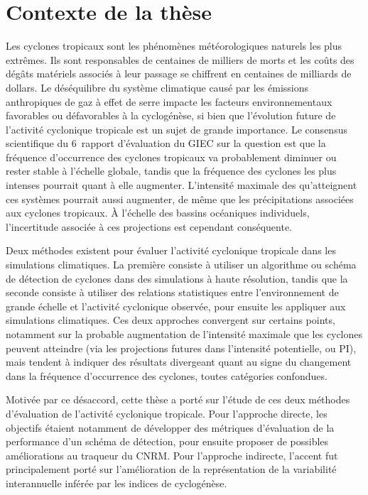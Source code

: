 \documentclass[../main.tex]{subfiles}
\begin{document}
\section*{Contexte de la thèse}

Les cyclones tropicaux sont les phénomènes météorologiques naturels les plus extrêmes. Ils sont responsables de centaines de milliers de morts et les coûts des
dégâts matériels associés à leur passage se chiffrent en centaines de milliards de dollars. Le déséquilibre du système climatique causé par les émissions
anthropiques de gaz à effet de serre impacte les facteurs environnementaux favorables ou défavorables à la cyclogénèse, si bien que l'évolution future de
l'activité cyclonique tropicale est un sujet de grande importance. Le consensus scientifique du 6\ieme\ rapport d'évaluation du GIEC sur la question est que la
fréquence d'occurrence des cyclones tropicaux va probablement diminuer ou rester stable à l'échelle globale, tandis que la fréquence des cyclones les plus
intenses pourrait quant à elle augmenter. L'intensité maximale des qu'atteignent ces systèmes pourrait aussi augmenter, de même que les précipitations associées
aux cyclones tropicaux. À l'échelle des bassins océaniques individuels, l'incertitude associée à ces projections est cependant conséquente.

Deux méthodes existent pour évaluer l'activité cyclonique tropicale dans les simulations climatiques. La première consiste à utiliser un algorithme ou schéma de
détection de cyclones dans des simulations à haute résolution, tandis que la seconde consiste à utiliser des relations statistiques entre l'environnement de
grande échelle et l'activité cyclonique observée, pour ensuite les appliquer aux simulations climatiques. Ces deux approches convergent sur certains points,
notamment sur la probable augmentation de l'intensité maximale que les cyclones peuvent atteindre (via les projections futures dans l'intensité potentielle, ou
PI), mais tendent à indiquer des résultats divergeant quant au signe du changement dans la fréquence d'occurrence des cyclones, toutes catégories confondues.

Motivée par ce désaccord, cette thèse a porté sur l'étude de ces deux méthodes d'évaluation de l'activité cyclonique tropicale. Pour l'approche directe, les
objectifs étaient notamment de développer des métriques d'évaluation de la performance d'un schéma de détection, pour ensuite proposer de possibles
améliorations au traqueur du CNRM. Pour l'approche indirecte, l'accent fut principalement porté sur l'amélioration de la représentation de la variabilité
interannuelle inférée par les indices de cyclogénèse.
\end{document}
